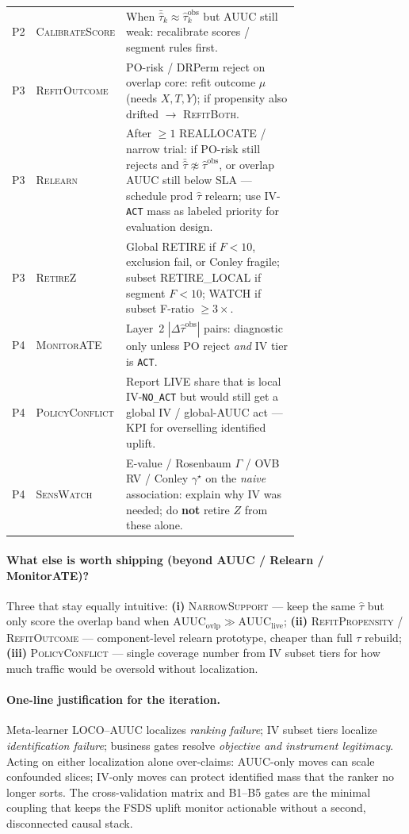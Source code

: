 \documentclass{article}
\begin{document}
\begin{center}
\begin{tabular}{@{}clp{0.72\linewidth}@{}}
P2 & \textsc{CalibrateScore} &
When $\bar{\hat\tau}_k\approx\widehat{\tau}^{\mathrm{obs}}_k$ but AUUC still weak: recalibrate scores / segment rules first. \\
P3 & \textsc{RefitOutcome} &
PO-risk / DRPerm reject on overlap core: refit outcome $\mu$ (needs $X,T,Y$); if propensity also drifted $\to$ \textsc{RefitBoth}. \\
P3 & \textsc{Relearn} &
After $\ge 1$ REALLOCATE / narrow trial: if PO-risk still rejects and $\bar{\hat\tau}\not\approx\widehat{\tau}^{\mathrm{obs}}$, or overlap AUUC still below SLA --- schedule prod $\hat\tau$ relearn; use IV-\texttt{ACT} mass as labeled priority for evaluation design. \\
P3 & \textsc{RetireZ} &
Global RETIRE if $F<10$, exclusion fail, or Conley fragile; subset RETIRE\_LOCAL if segment $F<10$; WATCH if subset F-ratio $\ge 3\times$. \\
P4 & \textsc{MonitorATE} &
Layer~2 $|\Delta\widehat{\tau}^{\mathrm{obs}}|$ pairs: diagnostic only unless PO reject \emph{and} IV tier is \texttt{ACT}. \\
P4 & \textsc{PolicyConflict} &
Report LIVE share that is local IV-\texttt{NO\_ACT} but would still get a global IV / global-AUUC act --- KPI for overselling identified uplift. \\
P4 & \textsc{SensWatch} &
E-value / Rosenbaum $\Gamma$ / OVB RV / Conley $\gamma^\star$ on the \emph{naive} association: explain why IV was needed; do \textbf{not} retire $Z$ from these alone. \\
\bottomrule
\end{tabular}
\end{center}

\paragraph{What else is worth shipping (beyond AUUC / Relearn / MonitorATE)?}
Three that stay equally intuitive:
\textbf{(i)} \textsc{NarrowSupport} --- keep the same $\hat\tau$ but only score the overlap band when $\mathrm{AUUC}_{\mathrm{ovlp}}\gg\mathrm{AUUC}_{\mathrm{live}}$;
\textbf{(ii)} \textsc{RefitPropensity} / \textsc{RefitOutcome} --- component-level relearn prototype, cheaper than full $\tau$ rebuild;
\textbf{(iii)} \textsc{PolicyConflict} --- single coverage number from IV subset tiers for how much traffic would be oversold without localization.

\paragraph{One-line justification for the iteration.}
Meta-learner LOCO--AUUC localizes \emph{ranking failure}; IV subset tiers
localize \emph{identification failure}; business gates resolve
\emph{objective and instrument legitimacy}.
Acting on either localization alone over-claims: AUUC-only moves can scale
confounded slices; IV-only moves can protect identified mass that the
ranker no longer sorts.
The cross-validation matrix and B1--B5 gates are the minimal coupling that
keeps the FSDS uplift monitor actionable without a second, disconnected
causal stack.
\end{document}
